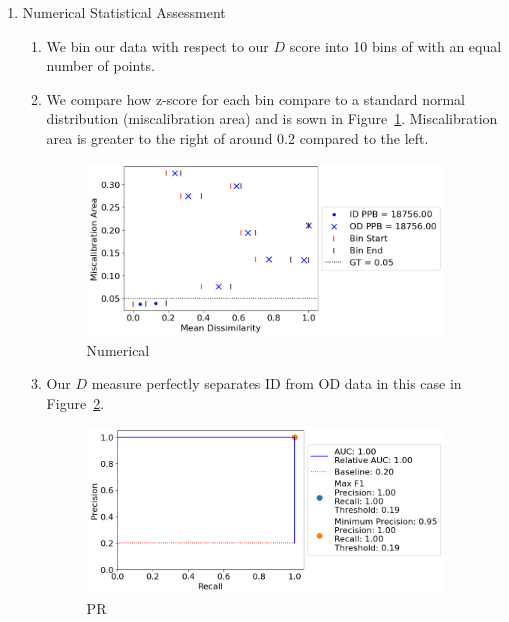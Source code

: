 \begin{enumerate}
    \item Numerical Statistical Assessment

    \begin{enumerate}
        \item We bin our data with respect to our $D$ score into 10 bins of with an equal number of points.

        \item We compare how z-score for each bin compare to a standard normal distribution (miscalibration area) and is sown in Figure~\ref{cond_stat}. Miscalibration area is greater to the right of around 0.2 compared to the left.

        \begin{figure}[H]
        \centering
        \includegraphics[width=0.95\textwidth]{figures/cond_stat.png}
        \caption{Numerical}
        \label{cond_stat}
        \end{figure}

        \item Our $D$ measure perfectly separates ID from OD data in this case in Figure~\ref{cond_stat_pr}.

        \begin{figure}[H]
        \centering
        \includegraphics[width=0.95\textwidth]{figures/cond_stat_pr.png}
        \caption{PR}
        \label{cond_stat_pr}
        \end{figure}
        
    \end{enumerate}
    
\end{enumerate}

